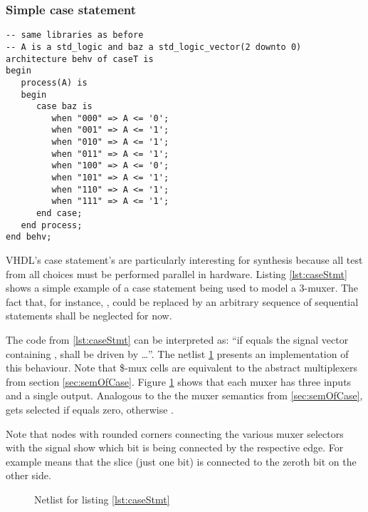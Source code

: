 \subsubsection{Simple case statement}
\leavevmode\begin{lstlisting}[style=vhdl, caption={Code for a simple case
      statement}, label={lst:caseStmt}]
-- same libraries as before
-- A is a std_logic and baz a std_logic_vector(2 downto 0)
architecture behv of caseT is
begin
   process(A) is
   begin
      case baz is
         when "000" => A <= '0';
         when "001" => A <= '1';
         when "010" => A <= '1';
         when "011" => A <= '1';
         when "100" => A <= '0';
         when "101" => A <= '1';
         when "110" => A <= '1';
         when "111" => A <= '1';
      end case;
   end process;
end behv;
\end{lstlisting}
%
VHDL's case statement's are particularly interesting for synthesis
because all test from all choices must be performed parallel in
hardware. Listing \ref{lst:caseStmt} shows a simple example of a
case statement being used to model a 3-muxer. The fact that,
for instance, , could be replaced by an arbitrary
sequence of sequential statements shall be neglected for now.

The code from \ref{lst:caseStmt} can be interpreted as: ``if  equals
the signal vector containing ,  shall be driven by
 \ldots''. The netlist \ref{fig:netlistCaseStmt} presents an
implementation of this behaviour. Note that \$-mux cells are
equivalent to the abstract multiplexers from section
\ref{sec:semOfCase}. Figure \ref{fig:netlistCaseStmt} shows that each
muxer has three inputs and a single output. Analogous to the the muxer semantics
from \ref{sec:semOfCase},  gets selected if  equals
zero, otherwise .

Note that nodes with rounded corners connecting the various muxer
selectors with the signal  show which bit is being connected
by the respective edge. For example  means that the
slice  (just one bit) is connected to the zeroth bit on the
other side.

\begin{figure}[p]
    \centering
    \caption{Netlist for listing \ref{lst:caseStmt}}
    
    \label{fig:netlistCaseStmt}
\end{figure}

